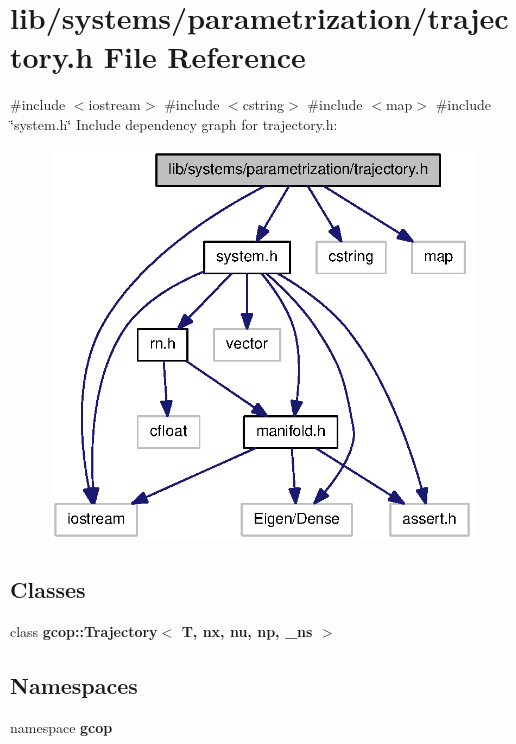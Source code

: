 \section{lib/systems/parametrization/trajectory.h \-File \-Reference}
\label{parametrization_2trajectory_8h}
{\ttfamily \#include $<$iostream$>$}\*
{\ttfamily \#include $<$cstring$>$}\*
{\ttfamily \#include $<$map$>$}\*
{\ttfamily \#include \char`\"{}system.\-h\char`\"{}}\*
\-Include dependency graph for trajectory.\-h\-:
\nopagebreak
\begin{figure}[H]
\begin{center}
\leavevmode
\includegraphics[width=318pt]{parametrization_2trajectory_8h__incl}
\end{center}
\end{figure}
\subsection*{\-Classes}
\begin{DoxyCompactItemize}
\item 
class {\bf gcop\-::\-Trajectory$<$ T, nx, nu, np, \-\_\-ns $>$}
\end{DoxyCompactItemize}
\subsection*{\-Namespaces}
\begin{DoxyCompactItemize}
\item 
namespace {\bf gcop}
\end{DoxyCompactItemize}
